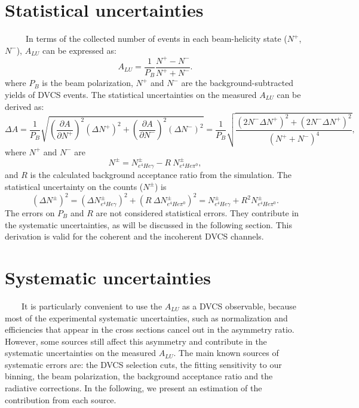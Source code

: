 \section{Statistical uncertainties}
~~~~~In terms of the collected number of events in each beam-helicity state ($N^{+}$, $N^{-}$), $A_{LU}$ can be expressed as:
\begin{equation}
A_{LU} = \frac{1}{P_{B}} \frac{N^{+} - N^{-}}{N^{+} + N^{-} }.
\label{equation: ALU}
\end{equation}
where $P_{B}$ is the beam polarization, $N^{+}$ and $N^{-}$ are the background-subtracted yields of DVCS events. The statistical uncertainties on the measured $A_{LU}$ can be derived as:
\begin{equation}
\Delta A = \frac{1}{P_{B}} \sqrt{\left(\frac{\partial A}{\partial N^{+}}\right)^{2} (\Delta N^{+})^{2} + \left(\frac{\partial A}{\partial N^{-}}\right)^{2} (\Delta N^{-})^{2}} = \frac{1}{P_{B}} \sqrt{\frac{(2N^{-} \Delta N^{+})^{2} + (2N^{-} \Delta N^{+})^{2}}{(N^{+} + N^{-})^{4} }},
\end{equation}
where $N^{+}$ and $N^{-}$ are
\begin{equation}
N^{\pm} = N^{\pm}_{e^{4}He\gamma} - R ~ N^{\pm}_{e^{4}He\pi^{0}},
\end{equation} 
and $R$ is the calculated background acceptance ratio from the simulation. The statistical uncertainty on the counts ($N^{\pm}$) is
\begin{equation}
(\Delta N^{\pm})^{2} = (\Delta N^{\pm}_{e^{4}He\gamma})^{2} + (R ~ \Delta N^{\pm}_{e^{4}He\pi^{0}})^{2} 
                       =  N^{\pm}_{e^{4}He\gamma} + R^2 N^{\pm}_{e^{4}He\pi^{0}}. 
\end{equation}
The errors on $P_{B}$ and $R$ are not considered statistical errors. They contribute in the systematic uncertainties, as will be discussed in the following section. This derivation is valid for the coherent and the incoherent DVCS channels.



\section{Systematic uncertainties}

~~~~It is particularly convenient to use the $A_{LU}$ as a DVCS observable, 
because most of the experimental systematic uncertainties, such as 
normalization and efficiencies that appear in the cross sections cancel out in 
the asymmetry ratio. However, some sources still affect this asymmetry and 
contribute in the systematic uncertainties on the measured $A_{LU}$. The main 
known sources of systematic errors are: the DVCS selection cuts, the fitting 
sensitivity to our binning, the beam polarization, the background acceptance 
ratio and the radiative corrections. In the following, we present an estimation 
of the contribution from each source.  

